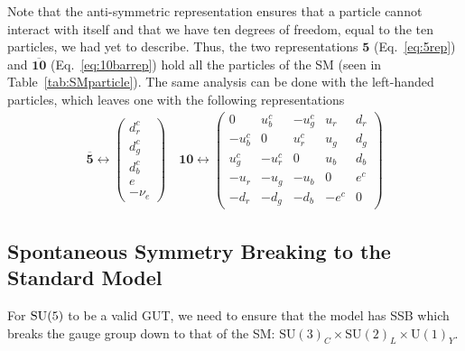 Note that the anti-symmetric representation ensures that a particle cannot interact with itself and that we have ten degrees of freedom, equal to the ten particles, we had yet to describe. Thus, the two representations $\mathbf{5}$ (Eq.~\eqref{eq:5rep}) and $\overline{\mathbf{10}}$ (Eq.~\eqref{eq:10barrep}) hold all the particles of the SM (seen in Table~\ref{tab:SMparticle}).
The same analysis can be done with the left-handed particles, which leaves one with the following representations 
\begin{align}
    \overline{\mathbf{5}} \leftrightarrow \begin{pmatrix}
        d_r^c \\ d_g^c \\ d_b^c \\ e \\ -\nu_e 
    \end{pmatrix} \quad 
    \mathbf{10} \leftrightarrow \begin{pmatrix}
    0 & u_b^c & -u_g^c & u_r & d_r \\
    -u_b^c & 0 & u_r^c & u_g & d_g \\
    u_g^c & -u_r^c & 0 & u_b & d_b \\
    -u_r & -u_g & -u_b & 0 & e^c \\
    -d_r & -d_g & -d_b & -e^c & 0
\end{pmatrix}\label{eq:5and10rep}
\end{align}
\subsection{Spontaneous Symmetry Breaking to the Standard Model}
For $\mathrm{SU}(5)$ to be a valid GUT, we need to ensure that the model has SSB which breaks the gauge group down to that of the SM: $\mathrm{SU}(3)_C\times\mathrm{SU}(2)_L\times\mathrm{U}(1)_Y$. 

